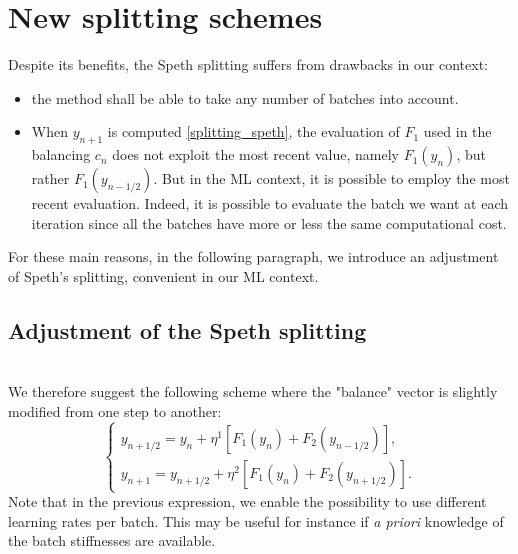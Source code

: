 \documentclass[article,authoryear,jmlmc]{beg_32}             %
\begin{document}
\section{New splitting schemes}
\label{new_splitting}

Despite its benefits, the Speth splitting suffers from drawbacks in our context:
\begin{itemize}
        \item the method shall be able to take any number of batches into account.
	\item When $y_{n+1}$ is computed \eqref{splitting_speth}, the evaluation of $F_1$ used in the balancing $c_n$ does not exploit the most recent value, namely $F_1(y_n)$, but rather $F_1(y_{n-1/2})$. But in the ML context, it is possible to employ the most recent evaluation. Indeed, it is possible to evaluate the batch we want at each iteration since all the batches have more or less the same computational cost. 
\end{itemize}
For these main reasons, in the following paragraph, we introduce an adjustment of Speth's splitting, convenient in our ML context. 

\subsection{Adjustment of the Speth splitting}
\label{extendedSpeth}
~~\\
We therefore suggest the following scheme where the "balance" vector is slightly modified from one step to another:
\begin{equation}
	\left\{
	\begin{array}{ll}
		y_{n+1/2} = y_n + \eta^1 \left[F_1(y_n)+F_2(y_{n-1/2})\right],\\
		y_{n+1} = y_{n+1/2} + \eta^2 \left[F_1(y_n)+F_2(y_{n+1/2})\right].
	\end{array}
	\right.
	\label{RAG_2batch}
\end{equation}
Note that in the previous expression, we enable the possibility to use different learning rates per batch. 
This may be useful for instance if {\em a priori} knowledge of the batch stiffnesses are available. 
\end{document}
